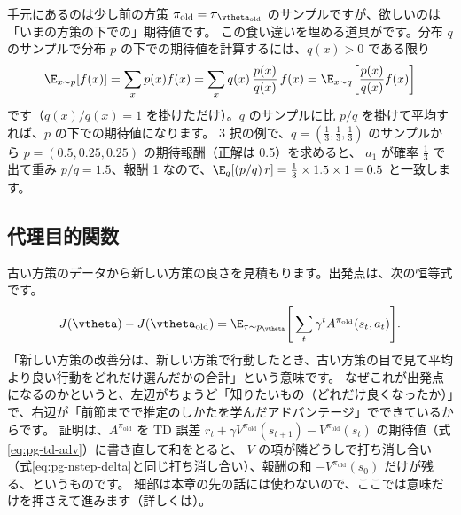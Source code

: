 手元にあるのは少し前の方策 $\pi_{\text{old}}=\pi_{\vtheta_{\text{old}}}$ のサンプルですが、欲しいのは「いまの方策の下での」期待値です。
この食い違いを埋める道具がです。分布 $q$ のサンプルで分布 $p$ の下での期待値を計算するには、$q(x)>0$ である限り
\begin{equation}
\E_{x\sim p}[f(x)]=\sum_x p(x)f(x)=\sum_x q(x)\,\frac{p(x)}{q(x)}\,f(x)=\E_{x\sim q}\!\left[\frac{p(x)}{q(x)}f(x)\right]
\label{eq:pg-importance}
\end{equation}
です（$q(x)/q(x)=1$ を掛けただけ）。$q$ のサンプルに比 $p/q$ を掛けて平均すれば、$p$ の下での期待値になります。
3 択の例で、$q=(\frac13,\frac13,\frac13)$ のサンプルから $p=(0.5,0.25,0.25)$ の期待報酬（正解は 0.5）を求めると、
$a_1$ が確率 $\frac13$ で出て重み $p/q=1.5$、報酬 1 なので、$\E_q[(p/q)\,r]=\frac13\times1.5\times1=0.5$ と一致します。

\subsection*{代理目的関数}

古い方策のデータから新しい方策の良さを見積もります。出発点は、次の恒等式です\cite{kakade2002approximately}。
\begin{equation}
J(\vtheta)-J(\vtheta_{\text{old}})=\E_{\tau\sim p_{\vtheta}}\Biggl[\,\sum_{t}\gamma^t A^{\pi_{\text{old}}}(s_t,a_t)\Biggr].
\label{eq:pg-perf-diff}
\end{equation}
「新しい方策の改善分は、新しい方策で行動したとき、古い方策の目で見て平均より良い行動をどれだけ選んだかの合計」という意味です。
なぜこれが出発点になるのかというと、左辺がちょうど「知りたいもの（どれだけ良くなったか）」で、右辺が「前節までで推定のしかたを学んだアドバンテージ」でできているからです。
証明は、$A^{\pi_{\text{old}}}$ を TD 誤差 $r_t+\gamma V^{\pi_{\text{old}}}(s_{t+1})-V^{\pi_{\text{old}}}(s_t)$ の期待値（式\eqref{eq:pg-td-adv}）に書き直して和をとると、
$V$ の項が隣どうしで打ち消し合い（式\eqref{eq:pg-nstep-delta}と同じ打ち消し合い）、報酬の和 $-V^{\pi_{\text{old}}}(s_0)$ だけが残る、というものです。
細部は本章の先の話には使わないので、ここでは意味だけを押さえて進みます（詳しくは\cite{kakade2002approximately}）。

